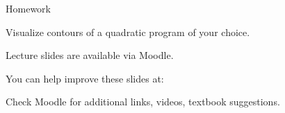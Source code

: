 \documentclass{beamer}
\begin{document}
\begin{frame}{Homework}
\begin{flushleft}

Visualize contours of a quadratic program of your choice.

\end{flushleft}
\end{frame}





\begin{frame}
	\centerline{Lecture slides are available via Moodle.}
	\bigskip
	\centerline{You can help improve these slides at:}
	\centerline{
		\mygit
	}
	\bigskip
	
	\textcolor{black}{}
	\bigskip
	
	
	\centerline{Check Moodle for additional links, videos, textbook suggestions.}
\end{frame}
\end{document}
